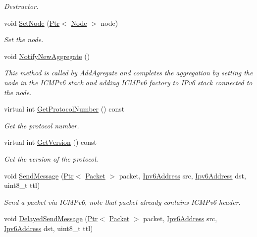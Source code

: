 \begin{DoxyCompactItemize}
\begin{DoxyCompactList}\small\item\em Destructor. \end{DoxyCompactList}\item 
void \hyperlink{classns3_1_1Icmpv6L4Protocol_af6108107ea3ca1dee9495671183bd31f}{Set\+Node} (\hyperlink{classns3_1_1Ptr}{Ptr}$<$ \hyperlink{classns3_1_1Node}{Node} $>$ node)
\begin{DoxyCompactList}\small\item\em Set the node. \end{DoxyCompactList}\item 
void \hyperlink{classns3_1_1Icmpv6L4Protocol_a5b150b21ea7d5337ec2021092fcf972b}{Notify\+New\+Aggregate} ()
\begin{DoxyCompactList}\small\item\em This method is called by Add\+Agregate and completes the aggregation by setting the node in the I\+C\+M\+Pv6 stack and adding I\+C\+M\+Pv6 factory to I\+Pv6 stack connected to the node. \end{DoxyCompactList}\item 
virtual int \hyperlink{classns3_1_1Icmpv6L4Protocol_ae84d887e897f60fb4fb41f3f93989825}{Get\+Protocol\+Number} () const 
\begin{DoxyCompactList}\small\item\em Get the protocol number. \end{DoxyCompactList}\item 
virtual int \hyperlink{classns3_1_1Icmpv6L4Protocol_a3ea4485be0a45707fd5e72363c737df2}{Get\+Version} () const 
\begin{DoxyCompactList}\small\item\em Get the version of the protocol. \end{DoxyCompactList}\item 
void \hyperlink{classns3_1_1Icmpv6L4Protocol_aca22b3999b518531f807d822060a06a8}{Send\+Message} (\hyperlink{classns3_1_1Ptr}{Ptr}$<$ \hyperlink{classns3_1_1Packet}{Packet} $>$ packet, \hyperlink{classns3_1_1Ipv6Address}{Ipv6\+Address} src, \hyperlink{classns3_1_1Ipv6Address}{Ipv6\+Address} dst, uint8\+\_\+t ttl)
\begin{DoxyCompactList}\small\item\em Send a packet via I\+C\+M\+Pv6, note that packet already contains I\+C\+M\+Pv6 header. \end{DoxyCompactList}\item 
void \hyperlink{classns3_1_1Icmpv6L4Protocol_a3c4b85301ce19b8b2791402972553127}{Delayed\+Send\+Message} (\hyperlink{classns3_1_1Ptr}{Ptr}$<$ \hyperlink{classns3_1_1Packet}{Packet} $>$ packet, \hyperlink{classns3_1_1Ipv6Address}{Ipv6\+Address} src, \hyperlink{classns3_1_1Ipv6Address}{Ipv6\+Address} dst, uint8\+\_\+t ttl)

\end{DoxyCompactItemize}

